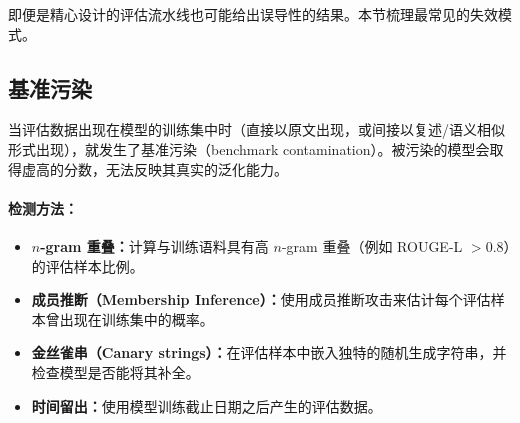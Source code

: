 即便是精心设计的评估流水线也可能给出误导性的结果。本节梳理最常见的失效模式。

\subsection{基准污染}
\label{benchmark-contamination}

当评估数据出现在模型的训练集中时（直接以原文出现，或间接以复述/语义相似形式出现），就发生了基准污染（benchmark contamination）。被污染的模型会取得虚高的分数，无法反映其真实的泛化能力。

\paragraph{检测方法：}
\label{detection-methods}

\begin{itemize}
  \item \textbf{$n$-gram 重叠：}计算与训练语料具有高 $n$-gram 重叠（例如 ROUGE-L $> 0.8$）的评估样本比例。
  \item \textbf{成员推断（Membership Inference）：}使用成员推断攻击来估计每个评估样本曾出现在训练集中的概率。
  \item \textbf{金丝雀串（Canary strings）：}在评估样本中嵌入独特的随机生成字符串，并检查模型是否能将其补全。
  \item \textbf{时间留出：}使用模型训练截止日期之后产生的评估数据。
\end{itemize}

